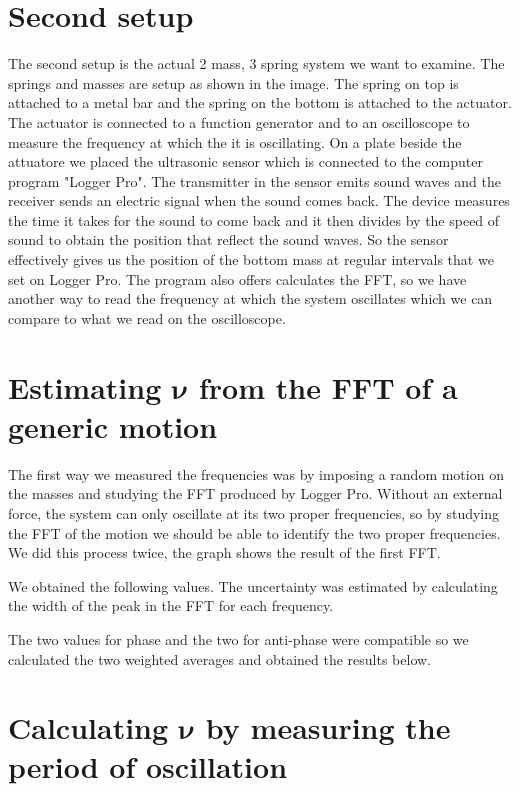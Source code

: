 \documentclass{article}
\begin{document}
\section{Second setup}
The second setup is the actual 2 mass, 3 spring system we want to examine. The springs and masses are setup as shown in the image. 
The spring on top is attached to a metal bar and the spring on the bottom is attached to the actuator. The actuator is connected to a function generator and to an oscilloscope to measure the frequency at which the it is oscillating. On a plate beside the attuatore we placed the ultrasonic sensor which is connected to the computer program "Logger Pro". The transmitter in the sensor emits sound waves and the receiver sends an electric signal when the sound comes back. The device measures the time it takes for the sound to come back and it then divides by the speed of sound to obtain the position that reflect the sound waves. So the sensor effectively gives us the position of the bottom mass at regular intervals that we set on Logger Pro. The program also offers calculates the FFT, so we have another way to read the frequency at which the system oscillates which we can compare to what we read on the oscilloscope. 

\section{Estimating $\bm \nu$ from the FFT of a generic motion}
The first way we measured the frequencies was by imposing a random motion on the masses and studying the FFT produced by Logger Pro. Without an external force, the system can only oscillate at its two proper frequencies, so by studying the FFT of the motion we should be able to identify the two proper frequencies. We did this process twice, the graph shows the result of the first FFT. 

We obtained the following values. The uncertainty was estimated by calculating the width of the peak in the FFT for each frequency.

The two values for phase and the two for anti-phase were compatible so we calculated the two weighted averages and obtained the results below.



\section{Calculating $\bm \nu$ by measuring the period of oscillation}
\end{document}
